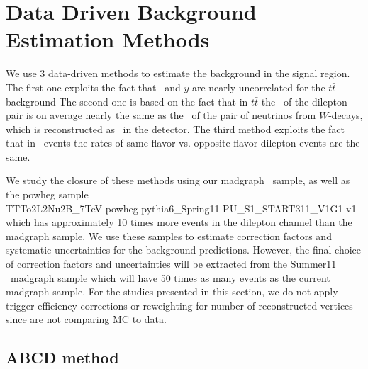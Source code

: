 \section{Data Driven Background Estimation Methods}
\label{sec:datadriven}
We use 3 data-driven methods to 
estimate the background in the signal region.
The first one exploits the fact that 
\Ht\ and $y$ are nearly 
uncorrelated for the $t\bar{t}$ background 
The second one 
is based on the fact that in $t\bar{t}$ the
\pt\ of the dilepton pair is on average 
nearly the same as the \pt\ of the pair of neutrinos
from $W$-decays, which is reconstructed as \met\ in the
detector. The third method exploits the fact that in \ttbar\ events
the rates of same-flavor vs. opposite-flavor dilepton events are
the same.

We study the closure of these methods using our madgraph \ttbar\ sample, as well as 
the powheg sample \\
TTTo2L2Nu2B\_7TeV-powheg-pythia6\_Spring11-PU\_S1\_START311\_V1G1-v1
which has approximately 10 times more events in the dilepton channel than the madgraph sample.
We use these samples to estimate correction factors and systematic uncertainties for the background predictions. 
However, the final choice of correction factors and uncertainties will be extracted from the Summer11 \ttbar\ madgraph
sample which will have 50 times as many events as the current madgraph sample. 
For the studies presented in this section, we do not apply trigger efficiency corrections or reweighting for
number of reconstructed vertices since are not comparing MC to data. 

\subsection{ABCD method}
\label{sec:abcd}


